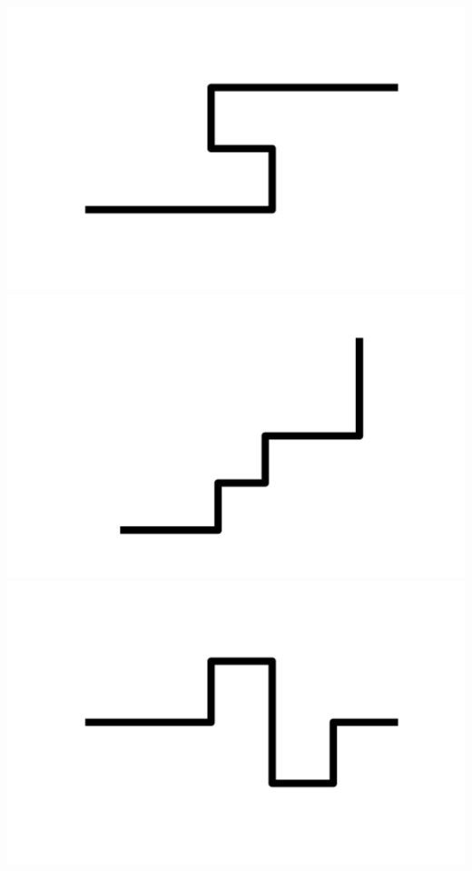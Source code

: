 \documentclass[]{report}
\begin{document}
\includegraphics[scale=.1]{pictures/21/state_cluster_shapes_61.pdf} 
\includegraphics[scale=.1]{pictures/21/state_cluster_shapes_62.pdf} 
\includegraphics[scale=.1]{pictures/21/state_cluster_shapes_63.pdf} 
\end{document}
